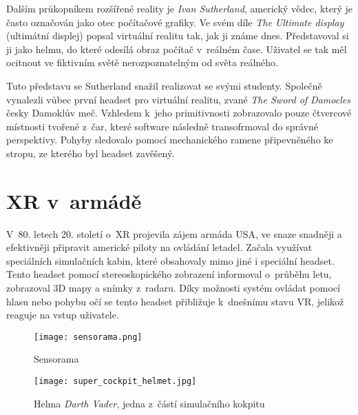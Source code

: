 Dalším průkopníkem rozšířené reality je \textit{Ivan Sutherland}, americký vědec, který je často označován jako otec počítačové grafiky. Ve svém díle \textit{The Ultimate display} (ultimátní displej) popsal virtuální realitu tak, jak ji známe dnes. Představoval si ji jako helmu, do které odesílá obraz počítač v~reálném čase. Uživatel se tak měl ocitnout ve fiktivním světě nerozpoznatelným od světa reálného. \cite{otechnice} \cite{ivan_sutherland_bio}

Tuto představu se Sutherland snažil realizovat se svými studenty. Společně vynalezli vůbec první headset pro virtuální realitu, zvané \textit{The Sword of Damocles} \poml česky Damoklův meč. Vzhledem k~jeho primitivnosti zobrazovalo pouze čtvercové místnosti tvořené z~čar, které software následně transofrmoval do správné perspektivy. Pohyby sledovalo pomocí mechanického ramene připevněného ke stropu, ze kterého byl headset zavěšený. \cite{otechnice} \cite{Rheingold_1992}

\section{XR v~armádě}

V~80. letech 20. století o~XR projevila zájem armáda USA, ve snaze snadněji a efektivněji připravit americké piloty na ovládání letadel. Začala využívat speciálních simulačních kabin, které obsahovaly mimo jiné i speciální headset. Tento headset pomocí stereoskopického zobrazení informoval o~průběhu letu, zobrazoval 3D mapy a snímky z~radaru. Díky možnosti systém ovládat pomocí hlasu nebo pohybu očí se tento headset přibližuje k~dnešnímu stavu VR, jelikož reaguje na vstup uživatele. \cite{otechnice}


\begin{figure}[H]
    \centering

    \begin{minipage}{.5\textwidth}
        \centering
        \texttt{[image: sensorama.png]}
        \caption{Sensorama \cite{sensorama_patent}}
        \label{sensorama_fig}
    \end{minipage}%
    \begin{minipage}{.5\textwidth}
        \centering
        \texttt{[image: super\_cockpit\_helmet.jpg]}
        \caption{Helma \textit{Darth Vader}, jedna z~částí simulačního kokpitu \cite{super_cockpit_image}}
        \label{sensorama}
    \end{minipage}

\end{figure}

